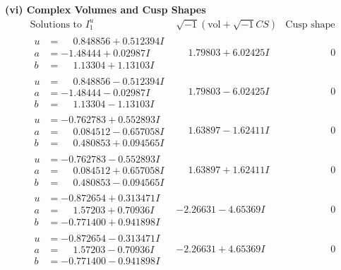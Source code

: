 \documentclass[1p]{elsarticle_modified}
\theoremstyle{definition}
\newcommand{\I}{\sqrt{-1}}
\begin{document}
\newpage\flushleft \textbf{(vi) Complex Volumes and Cusp Shapes}
$$\begin{array}{c|c|c}  
\text{Solutions to }I^u_{1}& \I (\text{vol} + \sqrt{-1}CS) & \text{Cusp shape}\\
 \hline 
\begin{aligned}
u &= \phantom{-}0.848856 + 0.512394 I \\
a &= -1.48444 + 0.02987 I \\
b &= \phantom{-}1.13304 + 1.13103 I\end{aligned}
 & \phantom{-}1.79803 + 6.02425 I & \phantom{-0.000000 } 0 \\ \hline\begin{aligned}
u &= \phantom{-}0.848856 - 0.512394 I \\
a &= -1.48444 - 0.02987 I \\
b &= \phantom{-}1.13304 - 1.13103 I\end{aligned}
 & \phantom{-}1.79803 - 6.02425 I & \phantom{-0.000000 } 0 \\ \hline\begin{aligned}
u &= -0.762783 + 0.552893 I \\
a &= \phantom{-}0.084512 - 0.657058 I \\
b &= \phantom{-}0.480853 + 0.094565 I\end{aligned}
 & \phantom{-}1.63897 - 1.62411 I & \phantom{-0.000000 } 0 \\ \hline\begin{aligned}
u &= -0.762783 - 0.552893 I \\
a &= \phantom{-}0.084512 + 0.657058 I \\
b &= \phantom{-}0.480853 - 0.094565 I\end{aligned}
 & \phantom{-}1.63897 + 1.62411 I & \phantom{-0.000000 } 0 \\ \hline\begin{aligned}
u &= -0.872654 + 0.313471 I \\
a &= \phantom{-}1.57203 + 0.70936 I \\
b &= -0.771400 + 0.941898 I\end{aligned}
 & -2.26631 - 4.65369 I & \phantom{-0.000000 } 0 \\ \hline\begin{aligned}
u &= -0.872654 - 0.313471 I \\
a &= \phantom{-}1.57203 - 0.70936 I \\
b &= -0.771400 - 0.941898 I\end{aligned}
 & -2.26631 + 4.65369 I & \phantom{-0.000000 } 0 \\ \hline\begin{aligned}

\end{aligned}
\end{array}$$
\end{document}
